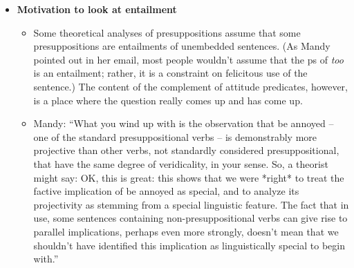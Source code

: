 \documentclass[11pt,fleqn]{article}
\newcommand{\6}{\mbox{$[\hspace*{-.6mm}[$}}
\newcommand{\9}{\mbox{$]\hspace*{-.6mm}]$}}
\begin{document}
{\begin{itemize}
\begin{itemize}
\begin{exe}
\ex
{}
\end{exe}

``Known information, however, is less related to what one thinks of as `grammar', and less immediately relevant to speaker-hearer interaction. It is rather a choice on the part of the speaker of a particular validity-level that s/he wishes to ascribe to the utterance. Markers of this choice [...] include the {\em it-}cleft and particular word choices ({\em the fact that}, factive predicates etc.). [...] known information may also signal deference, for the same reason that hedges do: both lessen the speaker's responsibility for the statement made; they reduce the speaker's assertiveness, claims to originality -- and, therefore, role.''

\item Bolinger (1977:68): ``A factive verb implies the factuality of its complement in the mind of the hearer, not the shared knowledge of it between speaker and hearer.''

\end{itemize}

\item {\bf Motivation to look at entailment}

\begin{itemize}

\item Some theoretical analyses of presuppositions assume that some presuppositions are entailments of unembedded sentences. (As Mandy pointed out in her email, most people wouldn't assume that the ps of {\em too} is an entailment; rather, it is a constraint on felicitous use of the sentence.) The content of the complement of attitude predicates, however, is a place where the question really comes up and has come up.

\item Mandy: ``What you wind up with is the observation that be annoyed -- one of the standard presuppositional verbs -- is demonstrably more projective than other verbs, not standardly considered presuppositional, that have the same degree of veridicality, in your sense. So, a theorist might say: OK, this is great: this shows that we were *right* to treat the factive implication of be annoyed as special, and to analyze its projectivity as stemming from a special linguistic feature. The fact that in use, some sentences containing non-presuppositional verbs can give rise to parallel implications, perhaps even more strongly, doesn't mean that we shouldn't have identified this implication as linguistically special to begin with.''


\end{itemize}
\end{itemize}}
\end{document}
